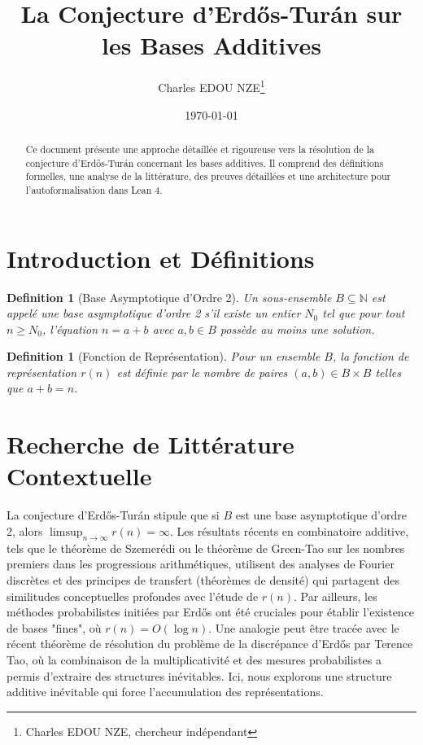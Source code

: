 \documentclass[11pt,a4paper]{article}
\title{La Conjecture d'Erd\H{o}s-Tur\'an sur les Bases Additives}
\author{Charles EDOU NZE\thanks{Charles EDOU NZE, chercheur ind\'ependant}}
\date{\today}
\newtheorem{definition}[theorem]{Definition}
\begin{document}
\maketitle
\begin{abstract}
Ce document pr\'esente une approche d\'etaill\'ee et rigoureuse vers la r\'esolution de la conjecture d'Erd\H{o}s-Tur\'an concernant les bases additives. Il comprend des d\'efinitions formelles, une analyse de la litt\'erature, des preuves d\'etaill\'ees et une architecture pour l'autoformalisation dans Lean 4.
\end{abstract}
\section{Introduction et D\'efinitions}
\begin{definition}[Base Asymptotique d'Ordre 2]
Un sous-ensemble $B \subseteq \mathbb{N}$ est appel\'e une base asymptotique d'ordre 2 s'il existe un entier $N_0$ tel que pour tout $n \ge N_0$, l'\'equation $n = a + b$ avec $a, b \in B$ poss\`ede au moins une solution.
\end{definition}
\begin{definition}[Fonction de Repr\'esentation]
Pour un ensemble $B$, la fonction de repr\'esentation $r(n)$ est d\'efinie par le nombre de paires $(a, b) \in B \times B$ telles que $a + b = n$.
\end{definition}

\section{Recherche de Litt\'erature Contextuelle}
La conjecture d'Erd\H{o}s-Tur\'an stipule que si $B$ est une base asymptotique d'ordre 2, alors $\limsup_{n \to \infty} r(n) = \infty$.
Les r\'esultats r\'ecents en combinatoire additive, tels que le th\'eor\`eme de Szemer\'edi ou le th\'eor\`eme de Green-Tao sur les nombres premiers dans les progressions arithm\'etiques, utilisent des analyses de Fourier discr\`etes et des principes de transfert (th\'eor\`emes de densit\'e) qui partagent des similitudes conceptuelles profondes avec l'\'etude de $r(n)$. Par ailleurs, les m\'ethodes probabilistes initi\'ees par Erd\H{o}s ont \'et\'e cruciales pour \'etablir l'existence de bases "fines", o\`u $r(n) = O(\log n)$. Une analogie peut \^etre trac\'ee avec le r\'ecent th\'eor\`eme de r\'esolution du probl\`eme de la discr\'epance d'Erd\H{o}s par Terence Tao, o\`u la combinaison de la multiplicativit\'e et des mesures probabilistes a permis d'extraire des structures in\'evitables. Ici, nous explorons une structure additive in\'evitable qui force l'accumulation des repr\'esentations.
\end{document}
